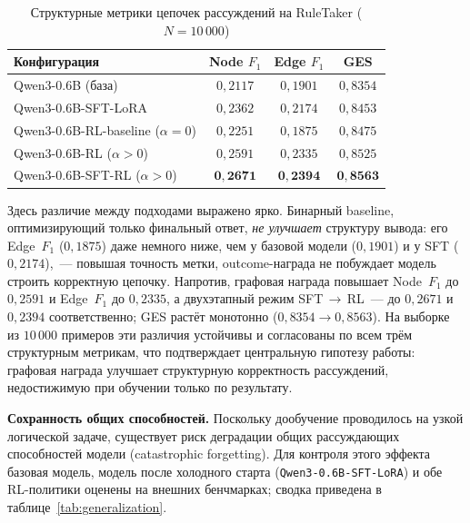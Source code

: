 \begin{table}[htbp]
\centering
\caption{Структурные метрики цепочек рассуждений на RuleTaker ($N=10\,000$)}
\label{tab:struct-metrics}
\begin{tabular}{|l|c|c|c|}
\hline
\textbf{Конфигурация} & \textbf{Node $F_1$} & \textbf{Edge $F_1$} & \textbf{GES} \\
\hline
Qwen3-0.6B (база)        & $0{,}2117$ & $0{,}1901$ & $0{,}8354$ \\
\hline
Qwen3-0.6B-SFT-LoRA      & $0{,}2362$ & $0{,}2174$ & $0{,}8453$ \\
\hline
Qwen3-0.6B-RL-baseline ($\alpha=0$) & $0{,}2251$ & $0{,}1875$ & $0{,}8475$ \\
\hline
Qwen3-0.6B-RL ($\alpha>0$) & $0{,}2591$ & $0{,}2335$ & $0{,}8525$ \\
\hline
Qwen3-0.6B-SFT-RL ($\alpha>0$) & $\mathbf{0{,}2671}$ & $\mathbf{0{,}2394}$ & $\mathbf{0{,}8563}$ \\
\hline
\end{tabular}
\end{table}

Здесь различие между подходами выражено ярко. Бинарный baseline, оптимизирующий только финальный ответ, \emph{не улучшает} структуру вывода: его Edge~$F_1$ ($0{,}1875$) даже немного ниже, чем у базовой модели ($0{,}1901$) и у SFT ($0{,}2174$),~--- повышая точность метки, outcome-награда не побуждает модель строить корректную цепочку. Напротив, графовая награда повышает Node~$F_1$ до $0{,}2591$ и Edge~$F_1$ до $0{,}2335$, а двухэтапный режим SFT\,$\to$\,RL~--- до $0{,}2671$ и $0{,}2394$ соответственно; GES растёт монотонно ($0{,}8354 \to 0{,}8563$). На выборке из $10\,000$ примеров эти различия устойчивы и согласованы по всем трём структурным метрикам, что подтверждает центральную гипотезу работы: графовая награда улучшает структурную корректность рассуждений, недостижимую при обучении только по результату.

\textbf{Сохранность общих способностей.} Поскольку дообучение проводилось на узкой логической задаче, существует риск деградации общих рассуждающих способностей модели (catastrophic forgetting). Для контроля этого эффекта базовая модель, модель после холодного старта (\texttt{Qwen3-0.6B-SFT-LoRA}) и обе RL-политики оценены на внешних бенчмарках; сводка приведена в таблице~\ref{tab:generalization}.


